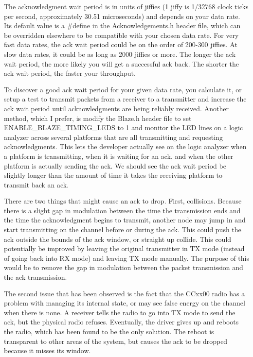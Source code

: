 \documentclass{article}
\begin{document}
The acknowledgment wait period is in units of jiffies (1 jiffy is 1/32768 clock ticks
per second, approximately 30.51 microseconds) and depends on your data rate.  
Its default value is a \#define in the Acknowledgements.h
header file, which can be overridden elsewhere to be compatible with your chosen data rate. 
For very fast data rates, the ack wait period could be on the order of 200-300 jiffies.  At slow
data rates, it could be as long as 2000 jiffies or more.  The longer the ack wait period, the more
likely you will get a successful ack back.  The shorter the ack wait period, the faster your
throughput.

To discover a good ack wait period for your given data rate, you calculate it, or setup a test to transmit
packets from a receiver to a transmitter and increase the ack wait period until acknowledgments
are being reliably received.  Another method, which I prefer, is modify the Blaze.h
header file to set ENABLE\_BLAZE\_TIMING\_LEDS to 1 and monitor the LED lines on a logic analyzer
across several platforms that are all transmitting and requesting acknowledgments. This lets the
developer actually see on the logic analyzer when a platform is transmitting, when it is waiting
for an ack, and when the other platform is actually sending the ack. We should see the ack wait
period be slightly longer than the amount of time it takes the receiving platform to transmit
back an ack.

There are two things that might cause an ack to drop. First, collisions. Because there is a slight
gap in modulation between the time the transmission ends and the time the acknowledgment begins to 
transmit, another node may jump in and start transmitting on the channel before or during the ack.
This could push the ack outside the bounds of the ack window, or straight up collide. This could 
potentially be improved by leaving the original transmitter in TX mode (instead of going back
into RX mode) and leaving TX mode manually. The purpose of this would be to remove the gap in
modulation between the packet transmission and the ack transmission.

The second issue that has been observed is the fact that the CCxx00 radio has a problem with managing
its internal state, or may see false energy on the channel when there is none. A receiver tells the
radio to go into TX mode to send the ack, but the physical radio refuses. Eventually, the driver 
gives up and reboots the radio, which has been found to be the only solution. The reboot is 
transparent to other areas of the system, but causes the ack to be dropped because it misses its window.
\end{document}
